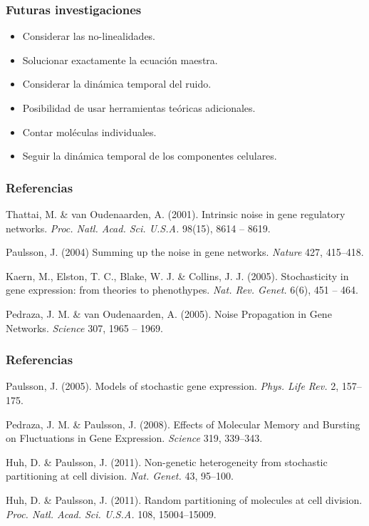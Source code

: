 \documentclass{beamer}
\begin{document}
\begin{frame}
\frametitle{Futuras investigaciones}
\begin{itemize}

\item Considerar las no-linealidades.
\item Solucionar exactamente la ecuaci\'on maestra.
\item Considerar la din\'amica temporal del ruido.
\item Posibilidad de usar herramientas te\'oricas adicionales.
\vspace{0.7cm}
\item Contar mol\'eculas individuales.
\item Seguir la din\'amica temporal de los componentes celulares.
\end{itemize}
\end{frame}

\footnotesize{
\begin{frame}
\frametitle{Referencias}
\begin{thebibliography}{99}
 Thattai, M. \& van Oudenaarden, A. (2001).
\newblock Intrinsic noise in gene regulatory networks.
\newblock \emph{Proc. Natl. Acad. Sci. U.S.A.} 98(15), 8614 -- 8619.

 Paulsson, J. (2004)
\newblock Summing up the noise in gene networks.
\newblock \emph{Nature} 427, 415--418.

 Kaern, M., Elston, T. C., Blake, W. J. \& Collins, J. J. (2005).
\newblock Stochasticity in gene expression: from theories to phenothypes.
\newblock \emph{Nat. Rev. Genet.} 6(6), 451 -- 464.

 Pedraza, J. M. \& van Oudenaarden, A. (2005).
\newblock Noise Propagation in Gene Networks.
\newblock \emph{Science} 307, 1965 -- 1969.
\end{thebibliography}
\end{frame}

\begin{frame}
\frametitle{Referencias}
\begin{thebibliography}{99}

 Paulsson, J. (2005).
\newblock Models of stochastic gene expression.
\newblock \emph{Phys. Life Rev.} 2, 157--175.

 Pedraza, J. M. \& Paulsson, J. (2008).
\newblock Effects of Molecular Memory and Bursting on Fluctuations in Gene Expression.
\newblock \emph{Science} 319, 339--343.

 Huh, D. \& Paulsson, J. (2011).
\newblock Non-genetic heterogeneity from stochastic partitioning at cell division.
\newblock \emph{Nat. Genet.} 43, 95--100.

 Huh, D. \& Paulsson, J. (2011).
\newblock Random partitioning of molecules at cell division.
\newblock \emph{Proc. Natl. Acad. Sci. U.S.A.} 108, 15004--15009.
\end{thebibliography}
\end{frame}
}
\end{document}
